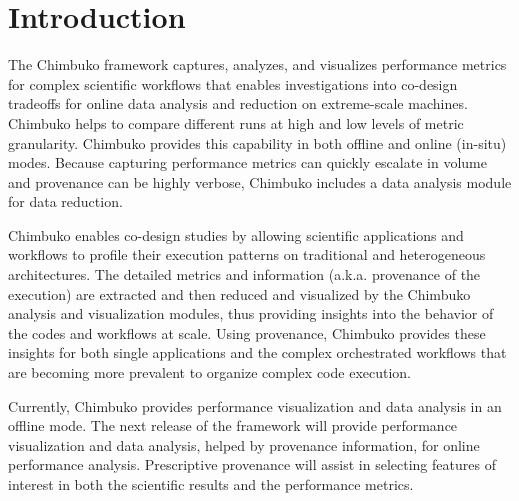 \section{Introduction}
The Chimbuko framework captures, analyzes, and visualizes performance metrics for complex scientific workflows that enables investigations into co-design tradeoffs for online data analysis and reduction on extreme-scale machines.
Chimbuko helps to compare different runs at high and low levels of metric granularity. Chimbuko provides this capability in both offline and online (in-situ) modes. Because capturing performance metrics can quickly escalate in volume and provenance can be highly verbose, Chimbuko includes a data analysis module for data reduction. 

Chimbuko enables co-design studies by allowing scientific applications and workflows to profile their execution patterns on traditional and heterogeneous architectures.  The detailed metrics and information (a.k.a. provenance of the execution) are extracted and then reduced and visualized by the Chimbuko analysis and visualization modules, thus providing insights into the behavior of the codes and workflows at scale.
Using provenance, Chimbuko provides these insights for both single applications and the complex orchestrated workflows that are becoming more prevalent to organize complex code execution.

Currently, Chimbuko provides performance visualization and data analysis in an offline mode.  The next release of the framework will provide performance visualization and data analysis, helped by provenance information, for online performance analysis. Prescriptive provenance will assist in selecting features of interest in both the scientific results and the performance metrics.

